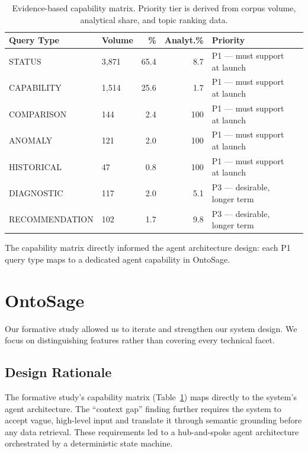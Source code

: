 \documentclass[acmsmall]{acmart}
\begin{document}
\begin{table}[t]
\centering
\caption{Evidence-based capability matrix. Priority tier is derived from corpus volume, analytical share, and topic ranking data.}
\label{tab:capability-matrix}
\small
\begin{tabular}{@{}llrrll@{}}
\toprule
\textbf{Query Type} & \textbf{Volume} & \textbf{\%} & \textbf{Analyt.\%} & \textbf{Priority} \\
\midrule
STATUS        & 3{,}871 & 65.4 &  8.7 & P1 --- must support at launch \\
CAPABILITY    & 1{,}514 & 25.6 &  1.7 & P1 --- must support at launch \\
COMPARISON    &    144  &  2.4 & 100  & P1 --- must support at launch \\
ANOMALY       &    121  &  2.0 & 100  & P1 --- must support at launch \\
HISTORICAL    &     47  &  0.8 & 100  & P1 --- must support at launch \\
DIAGNOSTIC    &    117  &  2.0 &  5.1 & P3 --- desirable, longer term \\
RECOMMENDATION &   102  &  1.7 &  9.8 & P3 --- desirable, longer term \\
\bottomrule
\end{tabular}
\end{table}

The capability matrix directly informed the agent architecture design: each P1 query type maps to a dedicated agent capability in OntoSage.


\section{OntoSage}
\label{sec:system}

Our formative study allowed us to iterate and strengthen our system design. We focus on distinguishing features rather than covering every technical facet.

\subsection{Design Rationale}

The formative study's capability matrix (Table~\ref{tab:capability-matrix}) maps directly to the system's agent architecture. The ``context gap'' finding further requires the system to accept vague, high-level input and translate it through semantic grounding before any data retrieval. These requirements led to a hub-and-spoke agent architecture orchestrated by a deterministic state machine.
\end{document}
